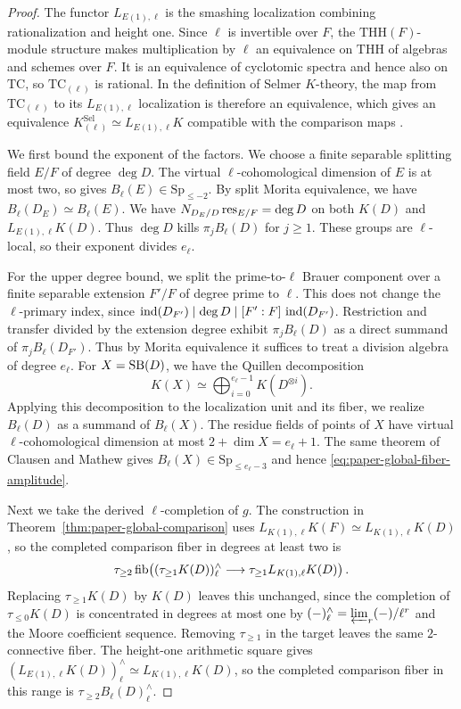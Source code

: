 \begin{proof}
The functor $L_{E(1),\ell}$ is the smashing localization combining rationalization and height one.
Since $\ell$ is invertible over $F$, the $\mathrm{THH}(F)$-module structure makes multiplication by $\ell$ an equivalence on $\mathrm{THH}$ of algebras and schemes over $F$.
It is an equivalence of cyclotomic spectra and hence also on $\mathrm{TC}$, so $\mathrm{TC}_{(\ell)}$ is rational.
In the definition of Selmer $K$-theory, the map from $\mathrm{TC}_{(\ell)}$ to its $L_{E(1),\ell}$ localization is therefore an equivalence, which gives an equivalence $K^{\mathrm{Sel}}_{(\ell)}\simeq L_{E(1),\ell}K$ compatible with the comparison maps \cite[Definition 6.1]{ClausenMathew}.

We first bound the exponent of the factors.
We choose a finite separable splitting field $E/F$ of degree $\deg D$.
The virtual $\ell$-cohomological dimension of $E$ is at most two, so \cite[Theorem 6.18]{ClausenMathew} gives $B_\ell(E)\in\mathrm{Sp}_{\le-2}$.
By split Morita equivalence, we have $B_\ell(D_E)\simeq B_\ell(E)$.
We have $N_{D_E/D}\operatorname{res}_{E/F}=\deg D$ on both $K(D)$ and $L_{E(1),\ell}K(D)$.
Thus $\deg D$ kills $\pi_jB_\ell(D)$ for $j\ge1$.
These groups are $\ell$-local, so their exponent divides $e_\ell$.

For the upper degree bound, we split the prime-to-$\ell$ Brauer component over a finite separable extension $F'/F$ of degree prime to $\ell$.
This does not change the $\ell$-primary index, since $\operatorname{ind}(D_{F'})\mid\deg D\mid[F':F]\,\operatorname{ind}(D_{F'})$.
Restriction and transfer divided by the extension degree exhibit $\pi_jB_\ell(D)$ as a direct summand of $\pi_jB_\ell(D_{F'})$.
Thus by Morita equivalence it suffices to treat a division algebra of degree $e_\ell$.
For $X=\operatorname{SB}(D)$, we have the Quillen decomposition \cite[Section 8]{QuillenHigher}
\[
 K(X)\simeq\bigoplus_{i=0}^{e_\ell-1}K(D^{\otimes i}).
\]
Applying this decomposition to the localization unit and its fiber, we realize $B_\ell(D)$ as a summand of $B_\ell(X)$.
The residue fields of points of $X$ have virtual $\ell$-cohomological dimension at most $2+\dim X=e_\ell+1$.
The same theorem of Clausen and Mathew gives $B_\ell(X)\in\mathrm{Sp}_{\le e_\ell-3}$ and hence \eqref{eq:paper-global-fiber-amplitude}.

Next we take the derived $\ell$-completion of $g$.
The construction in Theorem~\ref{thm:paper-global-comparison} uses $L_{K(1),\ell}K(F)\simeq L_{K(1),\ell}K(D)$, so the completed comparison fiber in degrees at least two is
\[
 \tau_{\ge2}\operatorname{fib}\!\left(
   (\tau_{\ge1}K(D))^\wedge_\ell
      \longrightarrow \tau_{\ge1}L_{K(1),\ell}K(D)
 \right).
\]
Replacing $\tau_{\ge1}K(D)$ by $K(D)$ leaves this unchanged, since the completion of $\tau_{\le0}K(D)$ is concentrated in degrees at most one by $(-)^\wedge_\ell=\varprojlim_r(-)/\ell^r$ and the Moore coefficient sequence.
Removing $\tau_{\ge1}$ in the target leaves the same $2$-connective fiber.
The height-one arithmetic square gives $(L_{E(1),\ell}K(D))^\wedge_\ell\simeq L_{K(1),\ell}K(D)$, so the completed comparison fiber in this range is $\tau_{\ge2}B_\ell(D)^\wedge_\ell$.


\end{proof}
